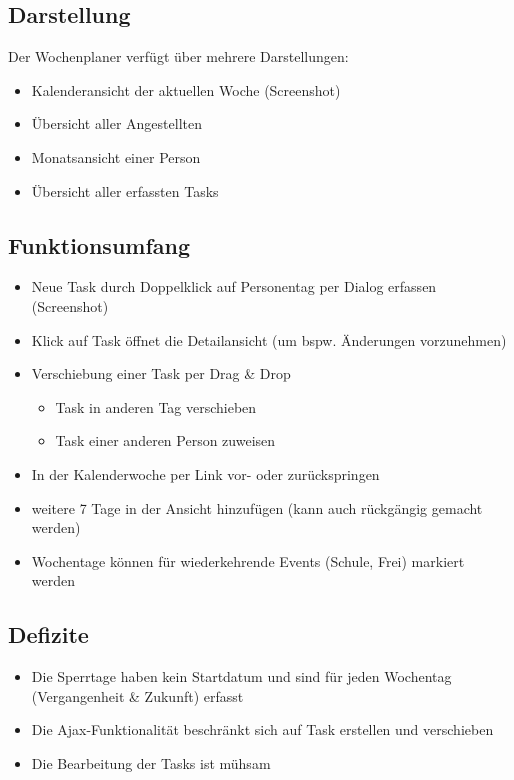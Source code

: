 \subsection{Darstellung}
Der Wochenplaner verfügt über mehrere Darstellungen:
\begin{itemize}
    \item Kalenderansicht der aktuellen Woche (Screenshot)
    \item Übersicht aller Angestellten
    \item Monatsansicht einer Person
    \item Übersicht aller erfassten Tasks
\end{itemize}

\subsection{Funktionsumfang}
\begin{itemize}
    \item Neue Task durch Doppelklick auf Personentag per Dialog erfassen (Screenshot)
    \item Klick auf Task öffnet die Detailansicht (um bspw. Änderungen vorzunehmen)
    \item Verschiebung einer Task per Drag \& Drop
    \begin{itemize}
        \item Task in anderen Tag verschieben
        \item Task einer anderen Person zuweisen
    \end{itemize}
    \item In der Kalenderwoche per Link vor- oder zurückspringen
    \item weitere 7 Tage in der Ansicht hinzufügen (kann auch rückgängig gemacht werden)
    \item Wochentage können für wiederkehrende Events (Schule, Frei) markiert werden
\end{itemize}
\subsection{Defizite}
    \begin{itemize}
        \item Die Sperrtage haben kein Startdatum und sind für jeden Wochentag (Vergangenheit \& Zukunft) erfasst
        \item Die Ajax-Funktionalität beschränkt sich auf Task erstellen und verschieben
        \item Die Bearbeitung der Tasks ist mühsam
    \end{itemize}

